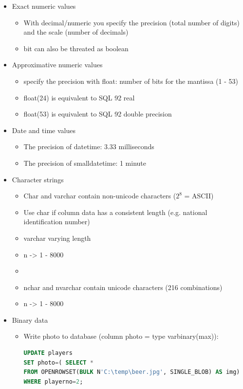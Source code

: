 \documentclass{report}
\begin{document}
    \begin{itemize}  
        \item Exact numeric values
        \begin{itemize}
            \item With decimal/numeric you specify the precision (total number of digits) and the scale (number of decimals)
            \item bit can also be threated as boolean
        \end{itemize}
        \item Approximative numeric values
        \begin{itemize}
            \item specify the precision with float: number of bits for the mantissa (1 - 53)
            \item float(24) is equivalent to SQL 92 real
            \item float(53) is equivalent to SQL 92 double precision
        \end{itemize}
        \item Date and time values
        \begin{itemize}
            \item The precision of datetime: 3.33 milliseconds
            \item The precision of smalldatetime: 1 minute
        \end{itemize}
        \item Character strings
        \begin{itemize}
            \item Char and varchar contain non-unicode characters ($2^8$ = ASCII)
            \item Use char if column data has a consistent length (e.g. national identification number)
            \item varchar varying length
            \item n -> 1 - 8000
            \item 
            \item nchar and nvarchar contain unicode characters (216 combinations)
            \item n -> 1 - 8000
        \end{itemize}
        \item Binary data
        \begin{itemize}
            \item Write photo to database (column photo = type varbinary(max)):
\begin{lstlisting}[language=SQL]
UPDATE players
SET photo=( SELECT *
FROM OPENROWSET(BULK N'C:\temp\beer.jpg', SINGLE_BLOB) AS img)
WHERE playerno=2;\end{lstlisting}
        \end{itemize}
        
    \end{itemize}
\end{document}
